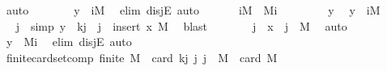 \begin{isabellebody}
\ auto\isanewline
\ \ \ \ \isamarkupfalse%
\ \isamarkupfalse%
\ {\isachardoublequoteopen}y\ {\isasymin}\ {\isacharquery}{\kern0pt}iM{\isachardoublequoteclose}\ \isamarkupfalse%
\ {\isacharparenleft}{\kern0pt}elim\ disjE{\isacharparenright}{\kern0pt}\ auto\isanewline
\ \ \isamarkupfalse%
\isanewline
{}\isamarkupfalse%
\isanewline
\ \ \isamarkupfalse%
\ {\isachardoublequoteopen}{\isacharquery}{\kern0pt}iM\ {\isasymsubseteq}\ {\isacharquery}{\kern0pt}Mi{\isachardoublequoteclose}\isanewline
\ \ \isamarkupfalse%
\isanewline
\ \ \ \ \isamarkupfalse%
\ y\ \isamarkupfalse%
\ {\isachardoublequoteopen}y\ {\isasymin}\ {\isacharquery}{\kern0pt}iM{\isachardoublequoteclose}\isanewline
\ \ \ \ \isamarkupfalse%
\ \isamarkupfalse%
\ j\ \ {\isacharbrackleft}{\kern0pt}simp{\isacharbrackright}{\kern0pt}{\isacharcolon}{\kern0pt}\ {\isachardoublequoteopen}y\ {\isacharequal}{\kern0pt}\ {\isacharparenleft}{\kern0pt}k{\isacharcomma}{\kern0pt}j{\isacharparenright}{\kern0pt}{\isachardoublequoteclose}\ \ {\isachardoublequoteopen}j\ {\isasymin}\ insert\ x\ M{\isachardoublequoteclose}\ \isamarkupfalse%
\ blast\isanewline
\ \ \ \ \isamarkupfalse%
\ \isamarkupfalse%
\ {\isachardoublequoteopen}j\ {\isacharequal}{\kern0pt}\ x\ {\isasymor}\ j\ {\isasymin}\ M{\isachardoublequoteclose}\ \isamarkupfalse%
\ auto\isanewline
\ \ \ \ \isamarkupfalse%
\ \isamarkupfalse%
\ {\isachardoublequoteopen}y\ {\isasymin}\ {\isacharquery}{\kern0pt}Mi{\isachardoublequoteclose}\ \isamarkupfalse%
\ {\isacharparenleft}{\kern0pt}elim\ disjE{\isacharparenright}{\kern0pt}\ auto\isanewline
\ \ \isamarkupfalse%
\isanewline
{}\isamarkupfalse%
%
\endisatagproof
{\isafoldproof}%
%
\isadelimproof
\isanewline
%
\endisadelimproof
\isanewline
{}\isamarkupfalse%
\ finite{\isacharunderscore}{\kern0pt}card{\isacharunderscore}{\kern0pt}set{\isacharunderscore}{\kern0pt}comp{\isacharcolon}{\kern0pt}\ {\isachardoublequoteopen}finite\ M\ {\isasymLongrightarrow}\ card\ {\isacharbraceleft}{\kern0pt}{\isacharparenleft}{\kern0pt}k{\isacharcomma}{\kern0pt}j{\isacharparenright}{\kern0pt}\ {\isacharbar}{\kern0pt}j{\isachardot}{\kern0pt}\ j\ {\isasymin}\ M{\isacharbraceright}{\kern0pt}\ {\isacharequal}{\kern0pt}\ card\ M{\isachardoublequoteclose}\isanewline
%
\isadelimproof

\end{isabellebody}
